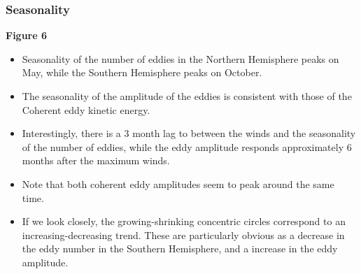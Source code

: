 \documentclass[draft,linenumbers]{agujournal2019}
\begin{document}
	\subsubsection{Seasonality}

	\textbf{Figure 6}
	\begin{itemize}
		\item Seasonality of the number of eddies in the Northern Hemisphere peaks on May, while the Southern Hemisphere peaks on October. 
		\item The seasonality of the amplitude of the eddies is consistent with those of the Coherent eddy kinetic energy. 
		\item Interestingly, there is a 3 month lag to between the winds and the seasonality of the number of eddies, while the eddy amplitude responds approximately 6 months after the maximum winds. 
		\item Note that both coherent eddy amplitudes seem to peak around the same time. 
		\item If we look closely, the growing-shrinking concentric circles correspond to an increasing-decreasing trend. These are particularly obvious as a decrease in the eddy number in the Southern Hemisphere, and a increase in the eddy amplitude. 
	\end{itemize}
\end{document}
